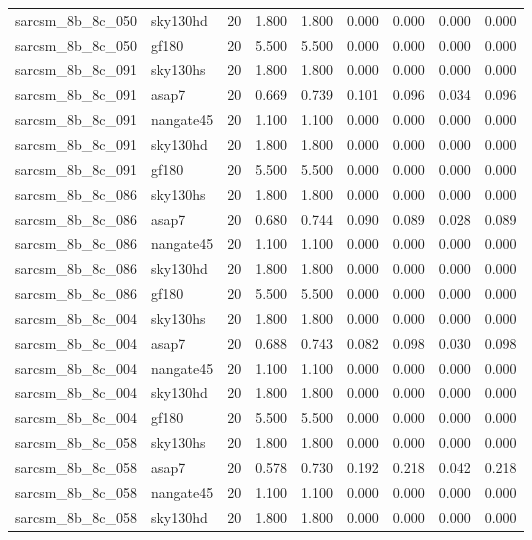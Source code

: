 \begin{tabular}{llrrrrrrr}
sarcsm\_8b\_8c\_050 & sky130hd & 20 & 1.800 & 1.800 & 0.000 & 0.000 & 0.000 & 0.000 \\
sarcsm\_8b\_8c\_050 & gf180 & 20 & 5.500 & 5.500 & 0.000 & 0.000 & 0.000 & 0.000 \\
sarcsm\_8b\_8c\_091 & sky130hs & 20 & 1.800 & 1.800 & 0.000 & 0.000 & 0.000 & 0.000 \\
sarcsm\_8b\_8c\_091 & asap7 & 20 & 0.669 & 0.739 & 0.101 & 0.096 & 0.034 & 0.096 \\
sarcsm\_8b\_8c\_091 & nangate45 & 20 & 1.100 & 1.100 & 0.000 & 0.000 & 0.000 & 0.000 \\
sarcsm\_8b\_8c\_091 & sky130hd & 20 & 1.800 & 1.800 & 0.000 & 0.000 & 0.000 & 0.000 \\
sarcsm\_8b\_8c\_091 & gf180 & 20 & 5.500 & 5.500 & 0.000 & 0.000 & 0.000 & 0.000 \\
sarcsm\_8b\_8c\_086 & sky130hs & 20 & 1.800 & 1.800 & 0.000 & 0.000 & 0.000 & 0.000 \\
sarcsm\_8b\_8c\_086 & asap7 & 20 & 0.680 & 0.744 & 0.090 & 0.089 & 0.028 & 0.089 \\
sarcsm\_8b\_8c\_086 & nangate45 & 20 & 1.100 & 1.100 & 0.000 & 0.000 & 0.000 & 0.000 \\
sarcsm\_8b\_8c\_086 & sky130hd & 20 & 1.800 & 1.800 & 0.000 & 0.000 & 0.000 & 0.000 \\
sarcsm\_8b\_8c\_086 & gf180 & 20 & 5.500 & 5.500 & 0.000 & 0.000 & 0.000 & 0.000 \\
sarcsm\_8b\_8c\_004 & sky130hs & 20 & 1.800 & 1.800 & 0.000 & 0.000 & 0.000 & 0.000 \\
sarcsm\_8b\_8c\_004 & asap7 & 20 & 0.688 & 0.743 & 0.082 & 0.098 & 0.030 & 0.098 \\
sarcsm\_8b\_8c\_004 & nangate45 & 20 & 1.100 & 1.100 & 0.000 & 0.000 & 0.000 & 0.000 \\
sarcsm\_8b\_8c\_004 & sky130hd & 20 & 1.800 & 1.800 & 0.000 & 0.000 & 0.000 & 0.000 \\
sarcsm\_8b\_8c\_004 & gf180 & 20 & 5.500 & 5.500 & 0.000 & 0.000 & 0.000 & 0.000 \\
sarcsm\_8b\_8c\_058 & sky130hs & 20 & 1.800 & 1.800 & 0.000 & 0.000 & 0.000 & 0.000 \\
sarcsm\_8b\_8c\_058 & asap7 & 20 & 0.578 & 0.730 & 0.192 & 0.218 & 0.042 & 0.218 \\
sarcsm\_8b\_8c\_058 & nangate45 & 20 & 1.100 & 1.100 & 0.000 & 0.000 & 0.000 & 0.000 \\
sarcsm\_8b\_8c\_058 & sky130hd & 20 & 1.800 & 1.800 & 0.000 & 0.000 & 0.000 & 0.000 \\

\end{tabular}
